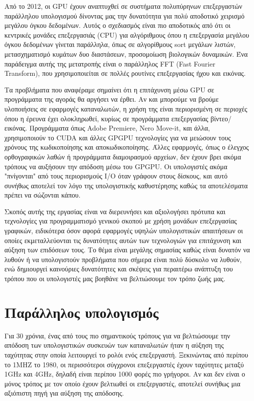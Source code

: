 Από το 2012, οι GPU έχουν αναπτυχθεί σε συστήματα πολυπύρηνων επεξεργαστών παράλληλου υπολογισμού δίνοντας μας την δυνατότητα για πολύ αποδοτικό χειρισμό μεγάλου όγκου δεδομένων. Αυτός ο σχεδιασμός είναι πιο αποδοτικός από ότι οι κεντρικές μονάδες επεξεργασιάς (CPU) για αλγόριθμους όπου η επεξεργασία μεγάλου όγκου δεδομένων γίνεται παράλληλα, όπως σε αλγορίθμους sort μεγάλων λιστών, μετασχηματισμό κυμάτων δυο διαστάσεων, προσομοίωση βιολογικών δυναμικών. Ένα παράδειγμα αυτής της μετατροπής είναι ο παράλληλος FFT (Fast Fourier Transform), που χρησιμοποιείται σε πολλές ρουτίνες επεξεργασίας ήχου και εικόνας.

Τα προβλήματα που αναφέραμε σημαίνει ότι η επιτάχυνση μέσω GPU σε προγράμματα της αγοράς θα αργήσει να έρθει. Αν και μπορούμε να βρούμε υλοποιήσεις σε εφαρμογές καταναλωτών, η χρήση της είναι περιορισμένη σε περιοχές όπου η έρευνα έχει ολοκληρωθεί, κυρίως σε προγράμματα επεξεργασίας βίντεο/εικόνας. Προγράμματα όπως Adobe Premiere, Nero Move-it, και άλλα, χρησιμοποιούν το CUDA και άλλες GPGPU τεχνολογίες για να μειώσουν τους χρόνους της κωδικοποίησης και αποκωδικοποίησης. Άλλες εφαρμογές, όπως ο έλεγχος ορθογραφικών λαθών ή προγράμματα διαμοιρασμού αρχείων, δεν έχουν βρει ακόμα τρόπους να αυξήσουν την απόδοση μέσω του GPGPU. Οι υπολογιστές ακόμα "πνίγονται" από τους περιορισμούς I/O όταν γράφουν στους δίσκους, και αυτό συνήθως αποτελεί τον λόγο της υπολογιστικής καθυστέρησης καθώς τα αποτελέσματα πρέπει να σώζονται κάπου.\cite{gpgpu-2}

Σκοπός αυτής της εργασίας είναι να διερευνήσει και αξιολογήσει πρότυπα και τεχνολογίες για προγραμματισμό γενικού σκοπού με χρήση μονάδων επεξεργασίας γραφικών, ειδικότερα όσον αφορά εφαρμογές υψηλών υπολογιστικών απαιτήσεων οι οποίες εκμεταλλεύονται τις δυνατότητες αυτών των τεχνολογιών για επιτάχυνση και αύξηση των επιδόσεων τους. Το θέμα είναι μεγάλης σημασίας καθώς είναι δυνατόν να λυθούν ή να υπολογιστούν προβλήματα που σήμερα είναι πολύ δύσκολο να λυθούν, ενώ δημιουργεί καινούριες δυνατότητες και σκέψεις για περαιτέρω ανάπτυξη του τρόπου που οι υπολογιστές μας βοηθάνε να βελτιώσουμε τον τρόπο ζωής μας.

\section*{Παράλληλος υπολογισμός}
Για 30 χρόνια, ένας από τους πιο σημαντικούς τρόπους για να βελτιώσουμε την απόδοση των υπολογιστικών συσκευών των καταναλωτών ήταν η αύξηση της ταχύτητας στην οποία λειτουργεί το ρολόι ενός επεξεργαστή. Ξεκινώντας από περίπου το 1MHZ το 1980, οι περισσότεροι σύγχρονοι επεξεργαστές έχουν ταχύτητες μεταξύ 1GHz και 4GHz, δηλαδή είναι περίπου 1000 φορές πιο γρήγοροι. Αν και δεν είναι ο μόνος τρόπος με τον οποίο έχουν βελτιωθεί οι επεξεργαστές, αποτελεί συνήθως μια αξιόπιστη πηγή για αύξηση της απόδοσης.

